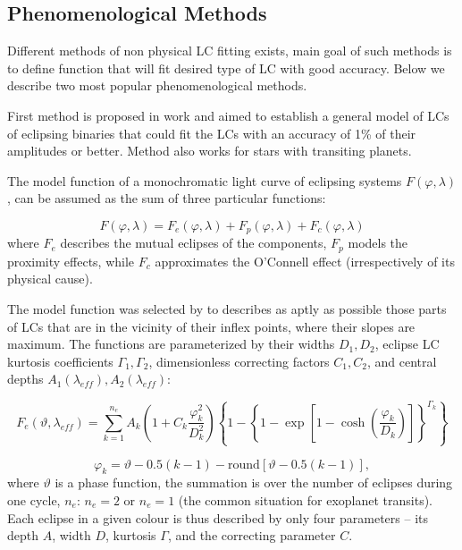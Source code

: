 \subsection{Phenomenological Methods}
\label{phenom}
Different methods of non physical LC fitting exists, 
main goal of such methods is to define function that will fit desired type of LC with good accuracy. 
Below we describe two most popular phenomenological methods.
  
First method is proposed in work \cite{mikulasek2015} and aimed to establish a general model of LCs of eclipsing binaries that could fit the LCs with an accuracy of 1\% of their amplitudes or better. Method also works for stars with transiting planets.

The model function of a monochromatic light curve of eclipsing
systems $F(\varphi, \lambda)$, can be assumed as the sum of three particular functions:

\begin{equation} \label{eq:mik_general}
F(\varphi, \lambda) = F_{e}(\varphi, \lambda) + F_{p}(\varphi, \lambda) + F_{c}(\varphi, \lambda)
\end{equation}
where $F_{e}$ describes the mutual eclipses of the components, $F_{p}$ models the proximity effects,
while $F_{c}$ approximates the O'Connell effect (irrespectively of its physical cause).


The model function was selected by \cite{mikulasek2015} to describes as aptly
as possible those parts of LCs that are in the vicinity of their inflex points, where their slopes are maximum. 
The functions are parameterized by their widths $D_{1}, D_{2}$, eclipse LC kurtosis
coefficients $\Gamma_{1}, \Gamma_{2}$, dimensionless correcting factors $C_{1},C_{2}$, and
central depths $A_{1}(\lambda_{eff}), A_{2}(\lambda_{eff})$:

\begin{equation} \label{eq:mik_main}
F_{e}(\vartheta, \lambda_{eff})=\sum_{k=1}^{n_{e}} A_{k} \left( 1+C_{k} \frac{\varphi_{k}^2}{D_{k}^2}\right) 
\left\lbrace 1-\left\lbrace 
1-\exp\left[ 1-\cosh\left(\frac{\varphi_{k}}{D_{k}}\right)\right] 
\right\rbrace^{\Gamma_{k}}\right\rbrace 
\end{equation}

\begin{equation} \label{eq:mik_2}
\varphi_{k} = \vartheta - 0.5 (k - 1) - \mathrm{round} \left[ \vartheta - 0.5 (k - 1)\right] ,
\end{equation}
where $\vartheta$ is a phase function, the summation is over the number of eclipses during one
cycle, $n_{e}$: $n_{e} = 2$ or $n_{e} = 1$ (the common situation for exoplanet
transits). Each eclipse in a given colour is thus described by only
four parameters -- its depth $A$, width $D$, kurtosis $\Gamma$, and the correcting
parameter $C$.

